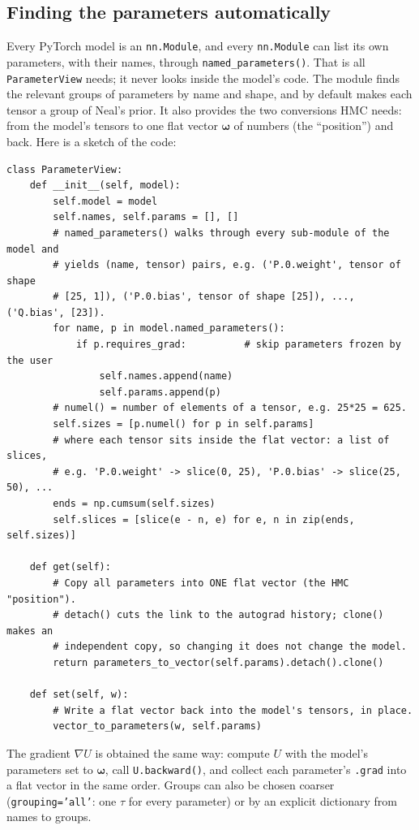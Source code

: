 \documentclass[11pt]{article}
\newcommand{\code}[1]{\texttt{#1}}
\newcommand{\bw}{\boldsymbol{\omega}}
\begin{document}
\subsection{Finding the parameters automatically}
\label{sec:view}

Every PyTorch model is an \code{nn.Module}, and every \code{nn.Module} can list its
own parameters, with their names, through \code{named\_parameters()}. That is all
\code{ParameterView} needs; it never looks inside the model's code. The module  finds the relevant groups of parameters by name and shape,
and by default makes each tensor a group of Neal's prior. It also provides the two
conversions HMC needs: from the model's tensors to one flat vector $\bw$ of 
numbers (the ``position'') and back. Here is a sketch of the code:

\begin{lstlisting}
class ParameterView:
    def __init__(self, model):
        self.model = model
        self.names, self.params = [], []
        # named_parameters() walks through every sub-module of the model and
        # yields (name, tensor) pairs, e.g. ('P.0.weight', tensor of shape
        # [25, 1]), ('P.0.bias', tensor of shape [25]), ..., ('Q.bias', [23]).
        for name, p in model.named_parameters():
            if p.requires_grad:          # skip parameters frozen by the user
                self.names.append(name)
                self.params.append(p)
        # numel() = number of elements of a tensor, e.g. 25*25 = 625.
        self.sizes = [p.numel() for p in self.params]
        # where each tensor sits inside the flat vector: a list of slices,
        # e.g. 'P.0.weight' -> slice(0, 25), 'P.0.bias' -> slice(25, 50), ...
        ends = np.cumsum(self.sizes)
        self.slices = [slice(e - n, e) for e, n in zip(ends, self.sizes)]

    def get(self):
        # Copy all parameters into ONE flat vector (the HMC "position").
        # detach() cuts the link to the autograd history; clone() makes an
        # independent copy, so changing it does not change the model.
        return parameters_to_vector(self.params).detach().clone()

    def set(self, w):
        # Write a flat vector back into the model's tensors, in place.
        vector_to_parameters(w, self.params)
\end{lstlisting}

\noindent The gradient $\nabla U$ is obtained the same way: compute $U$ with the
model's parameters set to $\bw$, call \code{U.backward()}, and collect each
parameter's \code{.grad} into a flat vector in the same order. Groups can also be
chosen coarser (\code{grouping='all'}: one $\tau$ for every parameter) or by an
explicit dictionary from names to groups.
\end{document}
